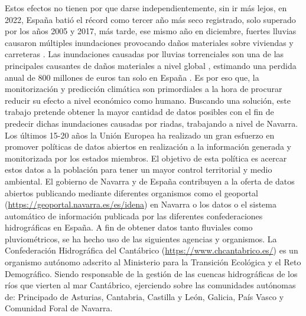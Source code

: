 Estos efectos no tienen por que darse independientemente, sin ir más lejos, en 2022, España batió el récord como tercer año más seco registrado, solo superado por los años 2005 y 2017, más tarde, ese mismo año en diciembre, fuertes lluvias causaron múltiples inundaciones provocando daños materiales sobre viviendas y carreteras \cite{NCEIWebPreci}.\newline
\newline
Las inundaciones causadas por lluvias torrenciales son una de las principales causantes de daños materiales a nivel global \cite{wasko2021incorporating}, estimando una perdida anual de 800 millones de euros tan solo en España \cite{Miteco}. Es por eso que, la monitorización y predicción climática son primordiales a la hora de procurar reducir su efecto a nivel económico como humano.\newline
\newline
Buscando una solución, este trabajo pretende obtener la mayor cantidad de datos posibles con el fin de predecir dichas inundaciones causadas por riadas, trabajando a nivel de Navarra.\newline
\newline
Los últimos 15-20 años la Unión Europea ha realizado un gran esfuerzo en promover políticas de datos abiertos en realización a la información generada y monitorizada por los estados miembros. El objetivo de esta política es acercar estos datos a la población para tener un mayor control territorial y medio ambiental. El gobierno de Navarra y de España contribuyen a la oferta de datos abiertos publicando mediante diferentes organismos como el geoportal (\url{https://geoportal.navarra.es/es/idena}) en Navarra o los datos o el sistema automático de información publicada por las diferentes confederaciones hidrográficas en España.\newline
\newline
A fin de obtener datos tanto fluviales como pluviométricos, se ha hecho uso de las siguientes agencias y organismos.\newline
\newline
La Confederación Hidrográfica del Cantábrico (\url{https://www.chcantabrico.es/}) es un organismo autónomo adscrito al Ministerio para la Transición Ecológica y el Reto Demográfico. Siendo responsable de la gestión de las cuencas hidrográficas de los ríos que vierten al mar Cantábrico, ejerciendo sobre las comunidades autónomas de: Principado de Asturias, Cantabria, Castilla y León, Galicia, País Vasco y Comunidad Foral de Navarra.\newline
